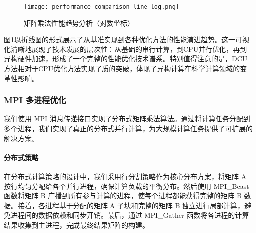 \documentclass[a4paper]{article}
\begin{document}
\begin{figure}[H]
\centering
\texttt{[image: performance\_comparison\_line\_log.png]}
\caption{矩阵乘法性能趋势分析（对数坐标）}
\label{fig:performance_trend}
\end{figure}

图\ref{fig:performance_trend}以折线图的形式展示了从基准实现到各种优化方法的性能演进趋势。这一可视化清晰地展现了技术发展的层次性：从基础的串行计算，到CPU并行优化，再到异构硬件加速，形成了一个完整的性能优化技术谱系。特别值得注意的是，DCU方法相对于CPU优化方法实现了质的突破，体现了异构计算在科学计算领域的变革性影响。

\subsubsection{MPI 多进程优化}

我们使用 MPI 消息传递接口实现了分布式矩阵乘法算法。通过将计算任务分配到多个进程，我们实现了真正的分布式并行计算，为大规模计算任务提供了可扩展的解决方案。

\paragraph{分布式策略}

在分布式计算策略的设计中，我们采用行分割策略作为核心分布方案，将矩阵 A 按行均匀分配给各个并行进程，确保计算负载的平衡分布。然后使用 MPI\_Bcast 函数将矩阵 B 广播到所有参与计算的进程，使每个进程都能获得完整的矩阵 B 数据。接着，各进程基于分配的矩阵 A 子块和完整的矩阵 B 独立进行局部计算，避免进程间的数据依赖和同步开销。最后，通过 MPI\_Gather 函数将各进程的计算结果收集到主进程，完成最终结果矩阵的构建。
\end{document}
